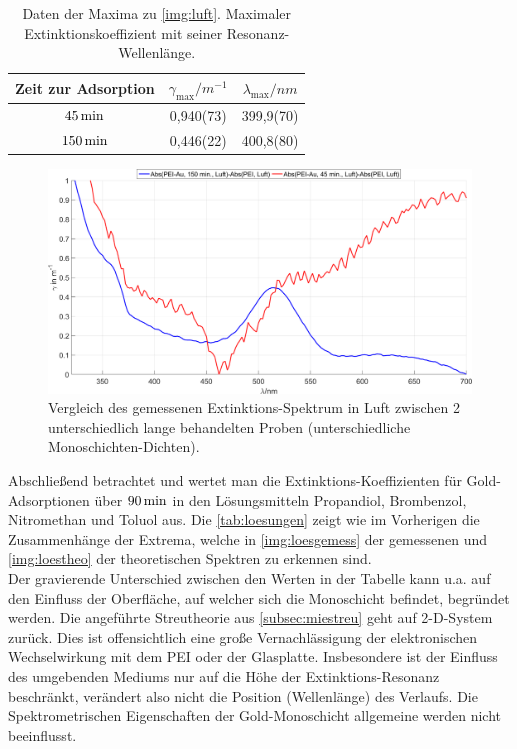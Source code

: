 \documentclass[numbers=noenddot,a4paper,notitlepage,twoside,BCOR15mm]{scrartcl}
\newcommand{\ix}[1]{_\text{#1}}
\begin{document}
			\begin{table}[H]
				\centering
				\begin{tabular}{c|c|c|}
					Zeit zur Adsorption & $\gamma\ix{max}/\unit{m^{-1}}$ & $\lambda\ix{max}/\unit{nm}$ \\ 
					\hline\hline $\unit[45]{min}$ & 0,940(73) & 399,9(70)  \\
					\hline $\unit[150]{min}$ & 0,446(22) & 400,8(80)
				\end{tabular} 
			\caption{Daten der Maxima zu \autoref{img:luft}. Maximaler Extinktionskoeffizient mit seiner Resonanz-Wellenlänge.}
			\label{tab:luft}
			\end{table}

				\begin{figure}[H]
					\centering
					\includegraphics[width=\textwidth]{absorp_spektren_luft.png}
					\caption{Vergleich des gemessenen Extinktions-Spektrum in Luft zwischen 2 unterschiedlich lange behandelten Proben (unterschiedliche Monoschichten-Dichten).}
					\label{img:luft}
				\end{figure}

			Abschließend betrachtet und wertet man die Extinktions-Koeffizienten für Gold-Adsorptionen über $\unit[90]{min}$ in den Lösungsmitteln Propandiol, Brombenzol, Nitromethan und Toluol aus. Die \autoref{tab:loesungen} zeigt wie im Vorherigen die Zusammenhänge der Extrema, welche in \autoref{img:loesgemess} der gemessenen und \autoref{img:loestheo} der theoretischen Spektren zu erkennen sind.\\
			Der gravierende Unterschied zwischen den Werten in der Tabelle kann u.a. auf den Einfluss der Oberfläche, auf welcher sich die Monoschicht befindet, begründet werden. Die angeführte Streutheorie aus \autoref{subsec:miestreu} geht auf 2-D-System zurück. Dies ist offensichtlich eine große Vernachlässigung der elektronischen Wechselwirkung mit dem PEI oder der Glasplatte. Insbesondere ist der Einfluss des umgebenden Mediums nur auf die Höhe der Extinktions-Resonanz beschränkt, verändert also nicht die Position (Wellenlänge) des Verlaufs. Die Spektrometrischen Eigenschaften der Gold-Monoschicht allgemeine werden nicht beeinflusst.
\end{document}

